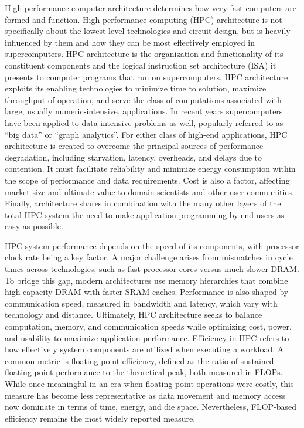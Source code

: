 \label{sec:background_hpc_hardware}
High performance computer architecture determines how very fast computers are formed and function. High performance computing (HPC) architecture is not specifically about the lowest-level technologies and circuit design, but is heavily influenced by them and how they can be most effectively employed in supercomputers. HPC architecture is the organization and functionality of its constituent components and the logical instruction set architecture (ISA) it presents to computer programs that run on supercomputers. HPC architecture exploits its enabling technologies to minimize time to solution, maximize throughput of operation, and serve the class of computations associated with large, usually numeric-intensive, applications. In recent years supercomputers have been applied to data-intensive problems as well, popularly referred to as “big data” or “graph analytics”. For either class of high-end applications, HPC architecture is created to overcome the principal sources of performance degradation, including starvation, latency, overheads, and delays due to contention. It must facilitate reliability and minimize energy consumption within the scope of performance and data requirements. Cost is also a factor, affecting market size and ultimate value to domain scientists and other user communities. Finally, architecture shares in combination with the many other layers of the total HPC system the need to make application programming by end users as easy as possible.

HPC system performance depends on the speed of its components, with processor clock rate being a key factor. A major challenge arises from mismatches in cycle times across technologies, such as fast processor cores versus much slower DRAM. To bridge this gap, modern architectures use memory hierarchies that combine high-capacity DRAM with faster SRAM caches. Performance is also shaped by communication speed, measured in bandwidth and latency, which vary with technology and distance. Ultimately, HPC architecture seeks to balance computation, memory, and communication speeds while optimizing cost, power, and usability to maximize application performance.
Efficiency in HPC refers to how effectively system components are utilized when executing a workload. A common metric is floating-point efficiency, defined as the ratio of sustained floating-point performance to the theoretical peak, both measured in FLOPs. While once meaningful in an era when floating-point operations were costly, this measure has become less representative as data movement and memory access now dominate in terms of time, energy, and die space. Nevertheless, FLOP-based efficiency remains the most widely reported measure.

